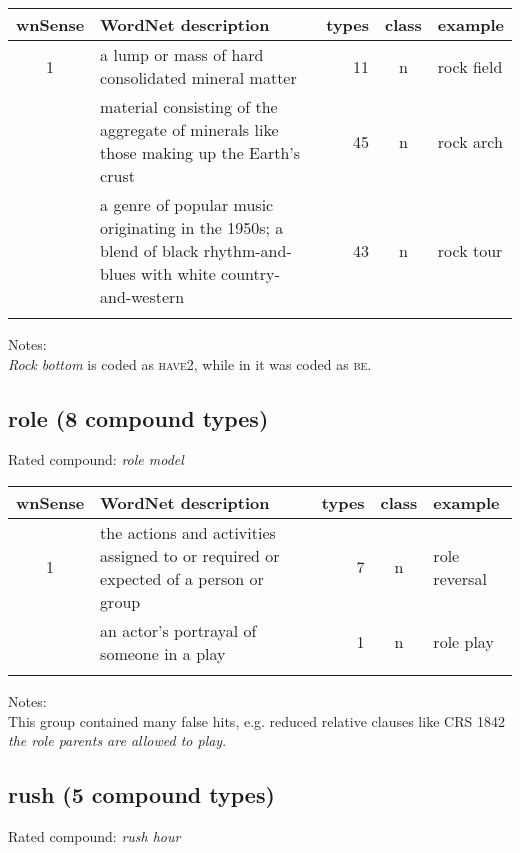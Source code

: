 \vspace*{1ex}

\noindent
\begin{longtable}{c>{\raggedright\arraybackslash}p{5cm}rc>{\raggedright\arraybackslash}p{2cm}}\lsptoprule
{\small wnSense}&WordNet description&types&class&example\\\midrule
1&a lump or mass of hard consolidated mineral matter&11&n&rock field\\\tablevspace
 2& material consisting of the aggregate of minerals like those making
up the Earth's crust& 45& n& rock arch\\\tablevspace
6&a genre of popular music originating in the 1950s; a blend of black rhythm-and-blues with white country-and-western&43&n&rock tour\\\lspbottomrule
\end{longtable}

\noindent
Notes:\\
\emph{Rock bottom} is coded as \textsc{have2}, while in
\citet{BellandSchaefer:2013} it was coded as \textsc{be}.

\subsection{role         (8 compound types)}
Rated compound: \emph{role model}
\vspace*{1ex}

\noindent
\begin{longtable}{c>{\raggedright\arraybackslash}p{5cm}rc>{\raggedright\arraybackslash}p{2cm}}\lsptoprule
{\small wnSense}&WordNet description&types&class&example\\\midrule
1&the actions and activities assigned to or required or expected of a
person or group&7&n&role reversal\\\tablevspace
2&an actor's portrayal of someone in a play&1&n&role play\\\lspbottomrule
\end{longtable}

\noindent
Notes:\\
This group contained many false hits, e.g. reduced relative clauses like CRS 1842 \emph{the role parents are allowed to play}.

\subsection{rush         (5 compound types)}
Rated compound: \emph{rush hour}

